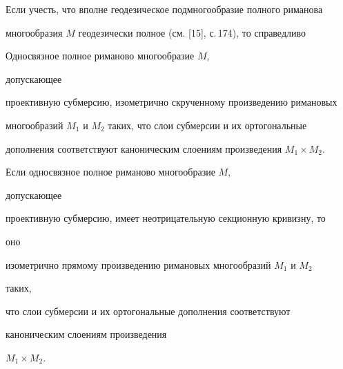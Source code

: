  


Если учесть, что вполне геодезическое подмногообразие полного риманова 


многообразия $M$ геодезически полное (см. [15], с.\,174), то справедливо 


 


\begin{cornonum} Односвязное полное риманово многообразие $M$, 


допускающее 


проективную субмерсию, изометрично скрученному произведению римановых 


многообразий $M_1$ и $M_2$ таких, что слои субмерсии и их ортогональные 


дополнения соответствуют каноническим слоениям произведения $M_1\times 


M_2$. 


\end{cornonum} 


 


\begin{thm} Если односвязное полное риманово многообразие $M$, 


допускающее 


проективную субмерсию, имеет неотрицательную секционную кривизну, то 


оно 


изометрично прямому произведению римановых многообразий $M_1$ и $M_2$ 


таких, 


что слои субмерсии и их ортогональные дополнения соответствуют 


каноническим слоениям произведения 


$M_1\times M_2$. 


\end{thm} 


 


